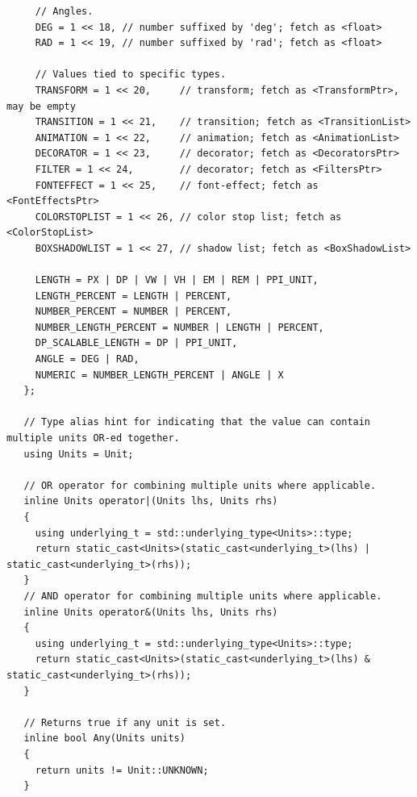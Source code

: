 \documentclass{article}
\begin{document}
\begin{verbatim}
     // Angles.
     DEG = 1 << 18, // number suffixed by 'deg'; fetch as <float>
     RAD = 1 << 19, // number suffixed by 'rad'; fetch as <float>

     // Values tied to specific types.
     TRANSFORM = 1 << 20,     // transform; fetch as <TransformPtr>, may be empty
     TRANSITION = 1 << 21,    // transition; fetch as <TransitionList>
     ANIMATION = 1 << 22,     // animation; fetch as <AnimationList>
     DECORATOR = 1 << 23,     // decorator; fetch as <DecoratorsPtr>
     FILTER = 1 << 24,        // decorator; fetch as <FiltersPtr>
     FONTEFFECT = 1 << 25,    // font-effect; fetch as <FontEffectsPtr>
     COLORSTOPLIST = 1 << 26, // color stop list; fetch as <ColorStopList>
     BOXSHADOWLIST = 1 << 27, // shadow list; fetch as <BoxShadowList>

     LENGTH = PX | DP | VW | VH | EM | REM | PPI_UNIT,
     LENGTH_PERCENT = LENGTH | PERCENT,
     NUMBER_PERCENT = NUMBER | PERCENT,
     NUMBER_LENGTH_PERCENT = NUMBER | LENGTH | PERCENT,
     DP_SCALABLE_LENGTH = DP | PPI_UNIT,
     ANGLE = DEG | RAD,
     NUMERIC = NUMBER_LENGTH_PERCENT | ANGLE | X
   };

   // Type alias hint for indicating that the value can contain multiple units OR-ed together.
   using Units = Unit;

   // OR operator for combining multiple units where applicable.
   inline Units operator|(Units lhs, Units rhs)
   {
     using underlying_t = std::underlying_type<Units>::type;
     return static_cast<Units>(static_cast<underlying_t>(lhs) | static_cast<underlying_t>(rhs));
   }
   // AND operator for combining multiple units where applicable.
   inline Units operator&(Units lhs, Units rhs)
   {
     using underlying_t = std::underlying_type<Units>::type;
     return static_cast<Units>(static_cast<underlying_t>(lhs) & static_cast<underlying_t>(rhs));
   }

   // Returns true if any unit is set.
   inline bool Any(Units units)
   {
     return units != Unit::UNKNOWN;
   }
  \end{verbatim}
\end{document}
